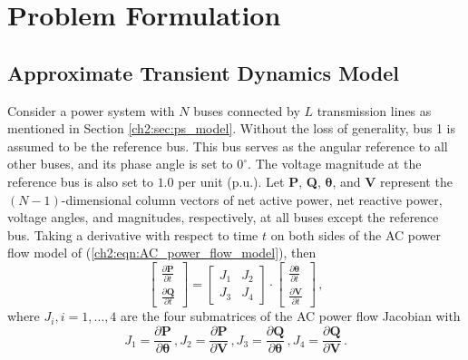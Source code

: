 \section{Problem Formulation}
\label{ch3:sec:formulation}

\subsection{Approximate Transient Dynamics Model}
\label{ch3:sec:power_model}

Consider a power system with $N$ buses connected by $L$ transmission lines as mentioned in Section \ref{ch2:sec:ps_model}. Without the loss of generality, bus 1 is assumed to be the reference bus. This bus serves as the angular reference to all other buses, and its phase angle is set to $0^\circ$. The voltage magnitude at the reference bus is also set to $1.0$ per unit (p.u.). Let \textbf{P}, \textbf{Q}, $\boldsymbol{\theta}$, and \textbf{V} represent the $(N-1)$-dimensional column vectors of net active power, net reactive power, voltage angles, and magnitudes, respectively, at all buses except the reference bus. Taking a derivative with respect to time $t$ on both sides of the AC power flow model of (\ref{ch2:eqn:AC_power_flow_model}), then
\begin{equation}
\label{ch3:eqn:ac_jacobian}
\left[\begin{array}{c} \frac{\partial \textbf{P}}{\partial t} \\[.5em] \frac{\partial \textbf{Q}}{\partial t}\end{array}\right]
=
\left[\begin{array}{c|c}
{J}_1 & {J}_2 \\
 \hline {J}_3 & {J}_4 
 \end{array}\right] 
\cdot \left[\begin{array}{c} \frac{\partial \boldsymbol{\theta}}{\partial t} \\[.5em] \frac{\partial \textbf{V}}{\partial t}\end{array}\right] \,,
\end{equation}
where ${J}_i, i = 1, \dots, 4$ are the four submatrices of the AC power flow Jacobian with 
\begin{equation}
{J}_1 = \frac{\partial \textbf{P}}{\partial \boldsymbol{\theta}} \,,  {J}_2 = \frac{\partial \textbf{P}}{\partial \mathbf{V}} \,, {J}_3 = \frac{\partial \textbf{Q}}{\partial \boldsymbol{\theta}} \,, {J}_4 = \frac{\partial \textbf{Q}}{\partial \textbf{V}} \,.
\end{equation}
